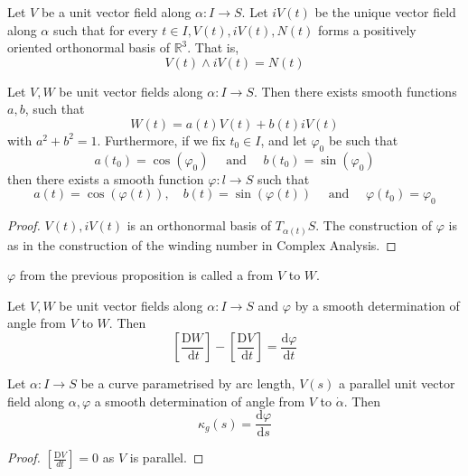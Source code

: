 \documentclass[10pt]{article}
\begin{document}
\begin{definition}
    Let $V$ be a unit vector field along $\alpha: I \rightarrow S$. Let $i V(t)$ be the unique vector field along $\alpha$ such that for every $t \in I, V(t), i V(t), N(t)$ forms a positively oriented orthonormal basis of $\mathbb{R}^3$. That is,
$$
V(t) \wedge i V(t)=N(t)
$$
\end{definition}

\begin{proposition}
    Let $V, W$ be unit vector fields along $\alpha: I \rightarrow S$. Then there exists smooth functions $a, b$, such that
$$
W(t)=a(t) V(t)+b(t) i V(t)
$$
with $a^2+b^2=1$. Furthermore, if we fix $t_0 \in I$, and let $\varphi_0$ be such that
$$
a\left(t_0\right)=\cos \left(\varphi_0\right) \quad \text { and } \quad b\left(t_0\right)=\sin \left(\varphi_0\right)
$$
then there exists a smooth function $\varphi: l \rightarrow S$ such that
$$
a(t)=\cos (\varphi(t)), \quad b(t)=\sin (\varphi(t)) \quad \text { and } \quad \varphi\left(t_0\right)=\varphi_0
$$
\end{proposition}
\begin{proof}
    $V(t), i V(t)$ is an orthonormal basis of $T_{\alpha(t)} S$. The construction of $\varphi$ is as in the construction of the winding number in Complex Analysis.
\end{proof}

\begin{definition}
    $\varphi$ from the previous proposition is called a  from $V$ to $W$.
\end{definition}

\begin{proposition}
Let $V, W$ be unit vector fields along $\alpha: I \rightarrow S$ and $\varphi$ by a smooth determination of angle from $V$ to $W$. Then
$$
\left[\frac{\mathrm{D} W}{\mathrm{~d} t}\right]-\left[\frac{\mathrm{D} V}{\mathrm{~d} t}\right]=\frac{\mathrm{d} \varphi}{\mathrm{d} t}
$$
\end{proposition}

\begin{proposition}
 Let $\alpha: I \rightarrow S$ be a curve parametrised by arc length, $V(s)$ a parallel unit vector field along $\alpha, \varphi$ a smooth determination of angle from $V$ to $\dot{\alpha}$. Then
$$
\kappa_g(s)=\frac{\mathrm{d} \varphi}{\mathrm{d} s}
$$
\end{proposition}
\begin{proof}
    $\left[\frac{\mathrm{D} V}{d t}\right]=0$ as $V$ is parallel.
\end{proof}
\end{document}
